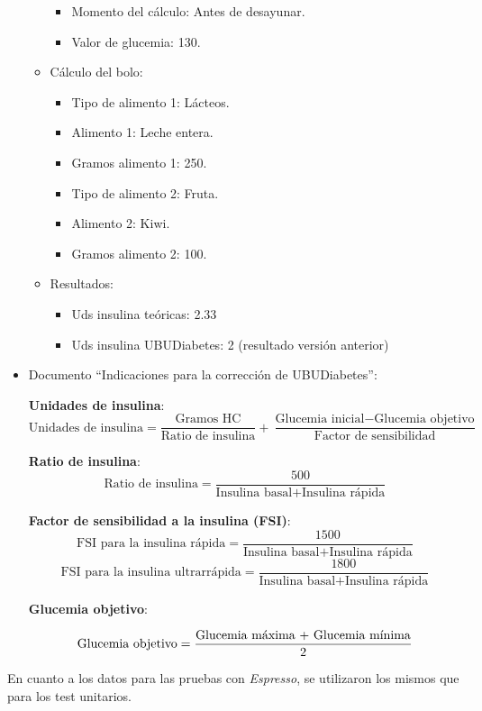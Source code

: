 \begin{itemize}
\begin{itemize}
\begin{itemize}
			\item Momento del cálculo: Antes de desayunar.
			\item Valor de glucemia: 130.
		\end{itemize}
		\item Cálculo del bolo:
		\begin{itemize}
			\item Tipo de alimento 1: Lácteos.
			\item Alimento 1: Leche entera.
			\item Gramos alimento 1: 250.
			\item Tipo de alimento 2: Fruta.
			\item Alimento 2: Kiwi.
			\item Gramos alimento 2: 100.
		\end{itemize}
		\item Resultados:
		\begin{itemize}
			\item Uds insulina teóricas: 2.33
			\item Uds insulina UBUDiabetes: 2 (resultado versión anterior)
		\end{itemize}
	\end{itemize}
	\item Documento ``Indicaciones para la corrección de UBUDiabetes'':
	
	\textbf{Unidades de insulina}:
	\[ \textrm{Unidades de insulina} = \frac{\textrm{Gramos HC}}{\textrm{Ratio de insulina}} + \frac{\textrm{Glucemia inicial} - \textrm{Glucemia objetivo}}{\textrm{Factor de sensibilidad}}\]

\textbf{Ratio de insulina}:
\[ \textrm{Ratio de insulina} = \frac{500}{\textrm{Insulina basal}+\textrm{Insulina rápida}}\]

\textbf{Factor de sensibilidad a la insulina (FSI)}:
\[ \textrm{FSI para la insulina rápida} = \frac{1500}{\textrm{Insulina basal}+\textrm{Insulina rápida}}\]
\[ \textrm{FSI para la insulina ultrarrápida} = \frac{1800}{\textrm{Insulina basal}+\textrm{Insulina rápida}}\]

\textbf{Glucemia objetivo}:

\[ \textrm{Glucemia objetivo} = \frac{\textrm{Glucemia máxima + \textrm{Glucemia mínima}}}{2}\]
\end{itemize}


En cuanto a los datos para las pruebas con \textit{Espresso}, se utilizaron los mismos que para los test unitarios.
